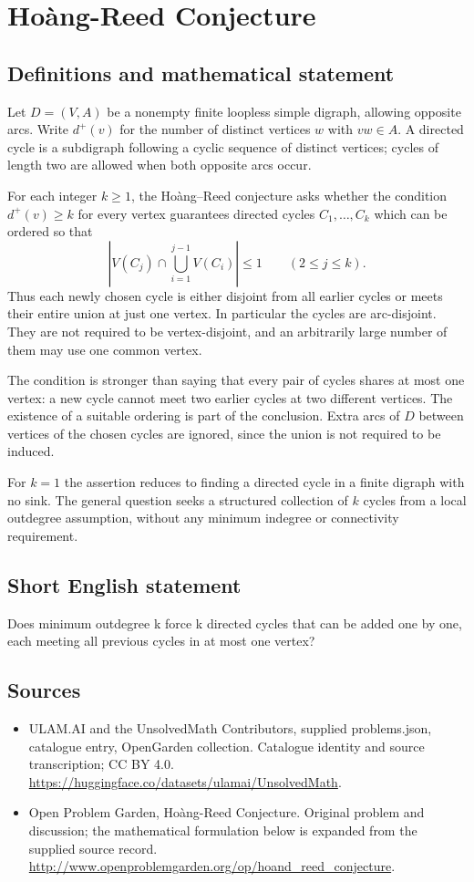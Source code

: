 \documentclass[11pt,a4paper]{article}
\begin{document}
\section*{Hoàng-Reed Conjecture}\label{statement}

\subsection{Definitions and mathematical statement}
Let $D=(V,A)$ be a nonempty finite loopless simple digraph, allowing opposite
arcs. Write $d^+(v)$ for the number of distinct vertices $w$ with
$vw\in A$. A directed cycle is a subdigraph following a cyclic sequence
of distinct vertices; cycles of length two are allowed when both
opposite arcs occur.

For each integer $k\ge1$, the Hoàng--Reed conjecture asks whether the
condition $d^+(v)\ge k$ for every vertex guarantees directed cycles
$C_1,\ldots,C_k$ which can be ordered so that
\[
 \left|V(C_j)\cap\bigcup_{i=1}^{j-1}V(C_i)\right|\le1
                         \qquad(2\le j\le k).
\]
Thus each newly chosen cycle is either disjoint from all earlier cycles
or meets their entire union at just one vertex. In particular the
cycles are arc-disjoint. They are not required to be vertex-disjoint,
and an arbitrarily large number of them may use one common vertex.

The condition is stronger than saying that every pair of cycles shares
at most one vertex: a new cycle cannot meet two earlier cycles at two
different vertices. The existence of a suitable ordering is part of
the conclusion. Extra arcs of $D$ between vertices of the chosen cycles
are ignored, since the union is not required to be induced.

For $k=1$ the assertion reduces to finding a directed cycle in a finite
digraph with no sink. The general question seeks a structured collection
of $k$ cycles from a local outdegree assumption, without any minimum
indegree or connectivity requirement.
\subsection{Short English statement}
Does minimum outdegree k force k directed cycles that can be added one by one, each meeting all previous cycles in at most one vertex?
\subsection{Sources}
\begin{itemize}
\item[S1] ULAM.AI and the UnsolvedMath Contributors, supplied problems.json, catalogue entry, OpenGarden collection. Catalogue identity and source transcription; CC BY 4.0.
\url{https://huggingface.co/datasets/ulamai/UnsolvedMath}.
\item[S2] Open Problem Garden, Hoàng-Reed Conjecture. Original problem and discussion; the mathematical formulation below is expanded from the supplied source record.
\url{http://www.openproblemgarden.org/op/hoand_reed_conjecture}.
\end{itemize}
\end{document}
